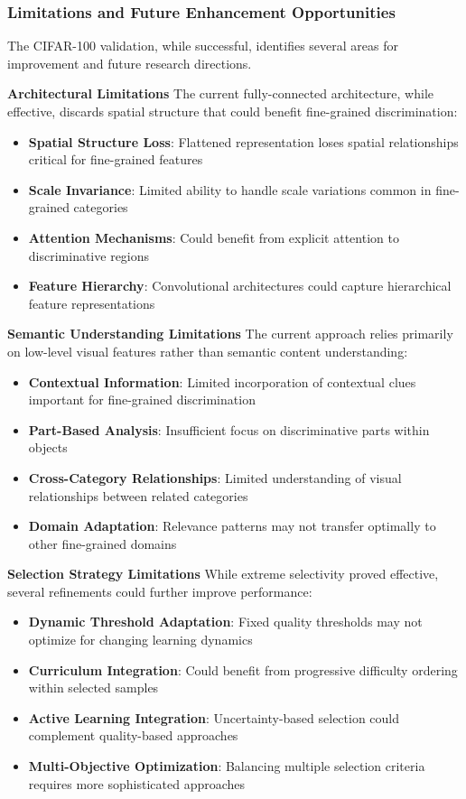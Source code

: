 \documentclass[12pt]{article}
\begin{document}
\subsubsection{Limitations and Future Enhancement Opportunities}\label{limitations}

The CIFAR-100 validation, while successful, identifies several areas for improvement and future research directions.

\textbf{Architectural Limitations}
The current fully-connected architecture, while effective, discards spatial structure that could benefit fine-grained discrimination:

\begin{itemize}
\item \textbf{Spatial Structure Loss}: Flattened representation loses spatial relationships critical for fine-grained features
\item \textbf{Scale Invariance}: Limited ability to handle scale variations common in fine-grained categories
\item \textbf{Attention Mechanisms}: Could benefit from explicit attention to discriminative regions
\item \textbf{Feature Hierarchy}: Convolutional architectures could capture hierarchical feature representations
\end{itemize}

\textbf{Semantic Understanding Limitations}
The current approach relies primarily on low-level visual features rather than semantic content understanding:

\begin{itemize}
\item \textbf{Contextual Information}: Limited incorporation of contextual clues important for fine-grained discrimination
\item \textbf{Part-Based Analysis}: Insufficient focus on discriminative parts within objects
\item \textbf{Cross-Category Relationships}: Limited understanding of visual relationships between related categories
\item \textbf{Domain Adaptation}: Relevance patterns may not transfer optimally to other fine-grained domains
\end{itemize}

\textbf{Selection Strategy Limitations}
While extreme selectivity proved effective, several refinements could further improve performance:

\begin{itemize}
\item \textbf{Dynamic Threshold Adaptation}: Fixed quality thresholds may not optimize for changing learning dynamics
\item \textbf{Curriculum Integration}: Could benefit from progressive difficulty ordering within selected samples
\item \textbf{Active Learning Integration}: Uncertainty-based selection could complement quality-based approaches
\item \textbf{Multi-Objective Optimization}: Balancing multiple selection criteria requires more sophisticated approaches
\end{itemize}
\end{document}
